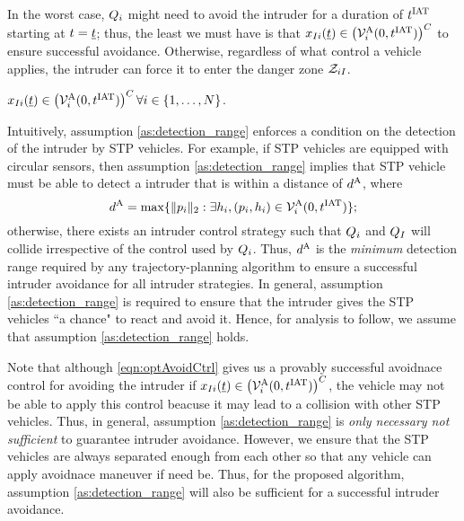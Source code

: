 In the worst case, $Q_i$ might need to avoid the intruder for a duration of $t^\text{IAT}$ starting at $t = \underline{t}$; thus, the least we must have is that $x_{I i}(\underline{t}) \in \left(\mathcal{V}^{\text{A}}_{i}(0, t^\text{IAT})\right)^C$ to ensure successful avoidance. Otherwise, regardless of what control a vehicle applies, the intruder can force it to enter the danger zone $\mathcal{Z}_{iI}$.
\begin{assumption}
\label{as:detection_range}
$x_{I i}(\underline{t}) \in \left(\mathcal{V}^{\text{A}}_{i}(0, t^\text{IAT})\right)^C \forall i \in \{1, \ldots, N\}$.
\end{assumption}
Intuitively, assumption \ref{as:detection_range} enforces a condition on the detection of the intruder by STP vehicles. For example, if STP vehicles are equipped with circular sensors, then assumption \ref{as:detection_range} implies that STP vehicle must be able to detect a intruder that is within a distance of $d^\text{A}$, where
\begin{equation} \label{eqn:sen_distance}
\dsen = \max\{ \|p_i\|_2: \exists \npos_i, (p_i, \npos_i) \in \brs^{\text{A}}_{i}(0, \iat) \};
\end{equation} 
otherwise, there exists an intruder control strategy such that $Q_i$ and $Q_{I}$ will collide irrespective of the control used by $Q_i$. Thus, $d^\text{A}$ is the \textit{minimum} detection range required by any trajectory-planning algorithm to ensure a successful intruder avoidance for all intruder strategies. In general, assumption \ref{as:detection_range} is required to ensure that the intruder gives the STP vehicles ``a chance" to react and avoid it. Hence, for analysis to follow, we assume that assumption \ref{as:detection_range} holds. 

Note that although \eqref{eqn:optAvoidCtrl} gives us a provably successful avoidnace control for avoiding the intruder if $x_{I i}(\underline{t}) \in \left(\mathcal{V}^{\text{A}}_{i}(0, t^\text{IAT})\right)^C$, the vehicle may not be able to apply this control beacuse it may lead to a collision with other STP vehicles. Thus, in general, assumption \ref{as:detection_range} is \textit{only necessary not sufficient} to guarantee intruder avoidance. However, we ensure that the STP vehicles are always separated enough from each other so that any vehicle can apply avoidnace maneuver if need be. Thus, for the proposed algorithm, assumption \ref{as:detection_range} will also be sufficient for a successful intruder avoidance.
